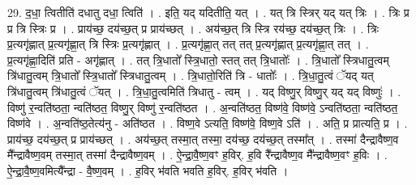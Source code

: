 \documentclass[17pt]{extarticle}
\begin{document}
29. द॒धा॒ त्वितीति॑ दधातु दधा॒ त्विति॑ । . इति॒ यद् यदितीति॒ यत् । . यत् त्रि स्त्रिर् यद् यत् त्रिः । . त्रिः प्र प्र त्रि स्त्रिः प्र । . प्राय॑च्छ॒ दय॑च्छ॒त् प्र प्राय॑च्छत् । . अय॑च्छ॒त् त्रि स्त्रि रय॑च्छ॒ दय॑च्छ॒त् त्रिः । . त्रिः प्र॒त्यगृ॑ह्णात् प्र॒त्यगृ॑ह्णा॒त् त्रि स्त्रिः प्र॒त्यगृ॑ह्णात् । . प्र॒त्यगृ॑ह्णा॒त् तत् तत् प्र॒त्यगृ॑ह्णात् प्र॒त्यगृ॑ह्णा॒त् तत् । . प्र॒त्यगृ॑ह्णा॒दिति॑ प्रति - अगृ॑ह्णात् । . तत् त्रि॒धातो᳚ स्त्रि॒धातो॒ स्तत् तत् त्रि॒धातोः᳚ । . त्रि॒धातो᳚ स्त्रिधातु॒त्वम् त्रि॑धातु॒त्वम् त्रि॒धातो᳚ स्त्रि॒धातो᳚ स्त्रिधातु॒त्वम् । . त्रि॒धातो॒रिति॑ त्रि - धातोः᳚ । . त्रि॒धा॒तु॒त्वं ॅयद् यत् त्रि॑धातु॒त्वम् त्रि॑धातु॒त्वं ॅयत् । . त्रि॒धा॒तु॒त्वमिति॑ त्रिधातु - त्वम् । . यद् विष्णु॒र् विष्णु॒र् यद् यद् विष्णुः॑ । . विष्णु॑ र॒न्वति॑ष्ठता॒ न्वति॑ष्ठत॒ विष्णु॒र् विष्णु॑ र॒न्वति॑ष्ठत । . अ॒न्वति॑ष्ठत॒ विष्ण॑वे॒ विष्ण॑वे॒ ऽन्वति॑ष्ठता॒ न्वति॑ष्ठत॒ विष्ण॑वे । . अ॒न्वति॑ष्ठ॒तेत्य॑नु - अति॑ष्ठत । . विष्ण॒वे ऽत्यति॒ विष्ण॑वे॒ विष्ण॒वे ऽति॑ । . अति॒ प्र प्रात्यति॒ प्र । . प्राय॑च्छ॒ दय॑च्छ॒त् प्र प्राय॑च्छत् । . अय॑च्छ॒त् तस्मा॒त् तस्मा॒ दय॑च्छ॒ दय॑च्छ॒त् तस्मा᳚त् । . तस्मा॑ दैन्द्रावैष्ण॒व मै᳚न्द्रावैष्ण॒वम् तस्मा॒त् तस्मा॑ दैन्द्रावैष्ण॒वम् । . ऐ॒न्द्रा॒वै॒ष्ण॒वꣳ ह॒विर्. ह॒वि रै᳚न्द्रावैष्ण॒व मै᳚न्द्रावैष्ण॒वꣳ ह॒विः । . ऐ॒न्द्रा॒वै॒ष्ण॒वमित्यै᳚न्द्रा - वै॒ष्ण॒वम् । . ह॒विर् भ॑वति भवति ह॒विर्. ह॒विर् भ॑वति । \newline
\end{document}
